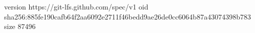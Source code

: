 version https://git-lfs.github.com/spec/v1
oid sha256:885fe190cafb64f2aa6092e2711f46bedd9ae26de0cc6064b87a43074398b783
size 87496

